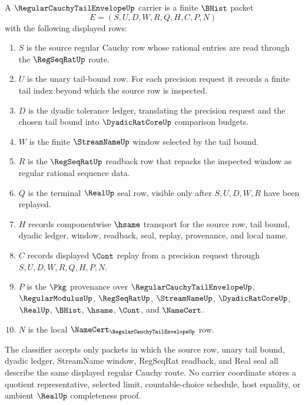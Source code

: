 \begin{definition}
\label{def:regular-cauchy-tail-envelope-carrier}
A $\RegularCauchyTailEnvelopeUp$ carrier is a finite $\BHist$ packet
$$
E=(S,U,D,W,R,Q,H,C,P,N)
$$
with the following displayed rows:
\begin{enumerate}
\item $S$ is the source regular Cauchy row whose rational entries are read through the $\RegSeqRatUp$ route.
\item $U$ is the unary tail-bound row. For each precision request it records a finite tail index beyond which the source row is inspected.
\item $D$ is the dyadic tolerance ledger, translating the precision request and the chosen tail bound into $\DyadicRatCoreUp$ comparison budgets.
\item $W$ is the finite $\StreamNameUp$ window selected by the tail bound.
\item $R$ is the $\RegSeqRatUp$ readback row that repacks the inspected window as regular rational sequence data.
\item $Q$ is the terminal $\RealUp$ seal row, visible only after $S,U,D,W,R$ have been replayed.
\item $H$ records componentwise $\hsame$ transport for the source row, tail bound, dyadic ledger, window, readback, seal, replay, provenance, and local name.
\item $C$ records displayed $\Cont$ replay from a precision request through $S,U,D,W,R,Q,H,P,N$.
\item $P$ is the $\Pkg$ provenance over $\RegularCauchyTailEnvelopeUp$, $\RegularModulusUp$, $\RegSeqRatUp$, $\StreamNameUp$, $\DyadicRatCoreUp$, $\RealUp$, $\BHist$, $\hsame$, $\Cont$, and $\NameCert$.
\item $N$ is the local $\NameCert_{\RegularCauchyTailEnvelopeUp}$ row.
\end{enumerate}
The classifier accepts only packets in which the source row, unary tail bound, dyadic ledger, StreamName window, RegSeqRat readback, and Real seal all describe the same displayed regular Cauchy route. No carrier coordinate stores a quotient representative, selected limit, countable-choice schedule, host equality, or ambient $\RealUp$ completeness proof.
\end{definition}

